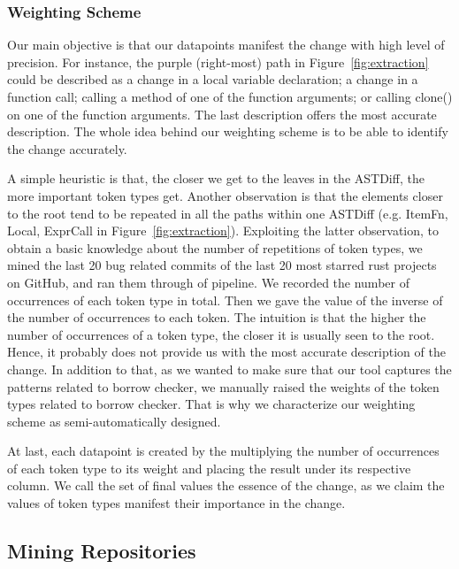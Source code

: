 \subsubsection{Weighting Scheme}

Our main objective is that our datapoints manifest the change with high level of precision. For instance, the purple (right-most) path in Figure~\ref{fig:extraction} could be described as a change in a local variable declaration; a change in a function call; calling a method of one of the function arguments; or calling clone() on one of the function arguments. The last description offers the most accurate description. The whole idea behind our weighting scheme is to be able to identify the change accurately. 

A simple heuristic is that, the closer we get to the leaves in the ASTDiff, the more important token types get. Another observation is that the elements closer to the root tend to be repeated in all the paths within one ASTDiff (e.g. ItemFn, Local, ExprCall in Figure~\ref{fig:extraction}). Exploiting the latter observation, to obtain a basic knowledge about the number of repetitions of token types, we mined the last 20 bug related commits of the last 20 most starred rust projects on GitHub, and ran them through of pipeline. We recorded the number of occurrences of each token type in total. Then we gave the value of the inverse of the number of occurrences to each token. The intuition is that the higher the number of occurrences of a token type, the closer it is usually seen to the root. Hence, it probably does not provide us with the most accurate description of the change. In addition to that, as we wanted to make sure that our tool captures the patterns related to borrow checker, we manually raised the weights of the token types related to borrow checker. That is why we characterize our weighting scheme as semi-automatically designed. 

At last, each datapoint is created by the multiplying the number of occurrences of each token type to its weight and placing the result under its respective column. We call the set of final values the essence of the change, as we claim the values of token types manifest their importance in the change.

\subsection{Mining Repositories}

